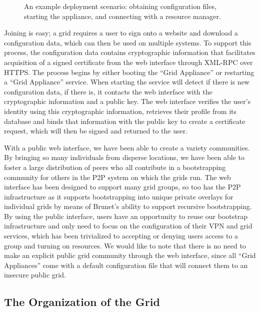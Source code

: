 \documentclass[twocolumn]{svjour3}
\begin{document}
\begin{figure}[ht]
\centering
{}
\caption{An example deployment scenario:  obtaining configuration files,
starting the appliance, and connecting with a resource manager.}
\label{fig:system}
\end{figure}

Joining is easy; a grid requires a user to sign onto a website and download a
configuration data, which can then be used on multiple systems.  To support
this process, the configuration data contains cryptographic information that
facilitates acquisition of a signed certificate from the web interface through
XML-RPC over HTTPS.  The process begins by either booting the ``Grid
Appliance'' or restarting a ``Grid Appliance'' service.  When starting the
service will detect if there is new configuration data, if there is, it
contacts the web interface with the cryptographic information and a public key.
The web interface verifies the user's identity using this cryptographic
information, retrieves their profile from its database and binds that
information with the public key to create a certificate request, which will
then be signed and returned to the user.

With a public web interface, we have been able to create a variety communities.
By bringing so many individuals from disperse locations, we have been able to
foster a large distribution of peers who all contribute in a bootstrapping
community for others in the P2P system on which the grids run.  The web
interface has been designed to support many grid groups, so too has the P2P
infrastructure as it supports bootstrapping into unique private overlays for
individual grids by means of Brunet's ability to support recursive
bootstrapping.  By using the public interface, users have an opportunity to
reuse our bootstrap infrastructure and only need to focus on the configuration
of their VPN and grid services, which has been trivialized to accepting or
denying users access to a group and turning on resources.  We would like to
note that there is no need to make an explicit public grid community through
the web interface, since all ``Grid Appliances'' come with a default
configuration file that will connect them to an insecure public grid.

\subsection{The Organization of the Grid}
\end{document}
